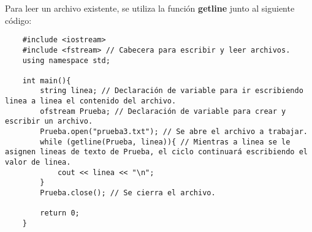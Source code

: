 Para leer un archivo existente, se utiliza la función \textbf{getline} junto al siguiente código:
\begin{lstlisting}
    #include <iostream>
    #include <fstream> // Cabecera para escribir y leer archivos.
    using namespace std;
    
    int main(){
        string linea; // Declaración de variable para ir escribiendo linea a linea el contenido del archivo.
        ofstream Prueba; // Declaración de variable para crear y escribir un archivo.
        Prueba.open("prueba3.txt"); // Se abre el archivo a trabajar.
        while (getline(Prueba, linea)){ // Mientras a linea se le asignen lineas de texto de Prueba, el ciclo continuará escribiendo el valor de linea.
            cout << linea << "\n";
        }
        Prueba.close(); // Se cierra el archivo.
        
        return 0;
    }
\end{lstlisting}
